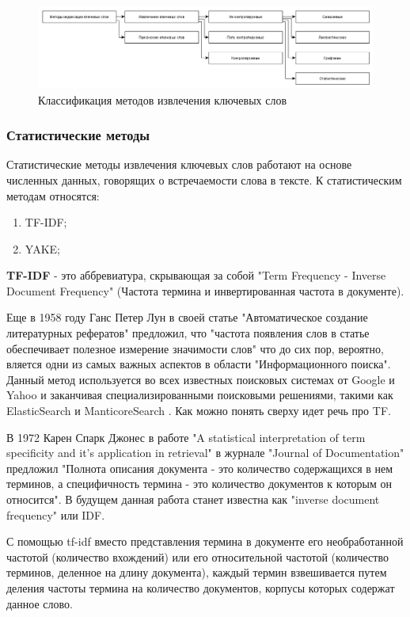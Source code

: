 
\begin{figure}[H]
	\centering
	\includegraphics[width=0.7\linewidth]{src/img/ke_types}
	\caption[]{Классификация методов извлечения ключевых слов}
	\label{fig:ketypes}
\end{figure}

\subsubsection{Статистические методы}
Статистические методы извлечения ключевых слов работают на основе численных данных, говорящих о встречаемости слова в тексте.
К статистическим методам относятся:
\begin{enumerate}
	\item TF-IDF;
	\item YAKE;
\end{enumerate}

\textbf{TF-IDF} - это аббревиатура, скрывающая за собой "Term Frequency - Inverse Document Frequency" (Частота термина и инвертированная частота в документе).

Еще в 1958 году Ганс Петер Лун в своей статье "Автоматическое создание литературных рефератов" предложил, что "частота появления слов в статье обеспечивает полезное измерение значимости слов" что до сих пор, вероятно, вляется одни из самых важных аспектов в области "Информационного поиска". 
Данный метод используется во всех известных поисковых системах от Google и Yahoo и заканчивая специализированными поисковыми решениями, такими как ElasticSearch и ManticoreSearch \cite{12}.
Как можно понять сверху идет речь про TF.

В 1972 Карен Спарк Джонес в работе "A statistical interpretation of term specificity and it's application in retrieval" в журнале "Journal of Documentation" \cite{11} предложил "Полнота описания документа - это количество содержащихся в нем терминов, а специфичность термина - это количество документов к которым он относится". 
В будущем данная работа станет известна как "inverse document frequency"  или IDF.

С помощью tf-idf вместо представления термина в документе его необработанной частотой (количество вхождений) или его относительной частотой (количество терминов, деленное на длину документа), каждый термин взвешивается путем деления частоты термина на количество документов, корпусы которых содержат данное слово.

